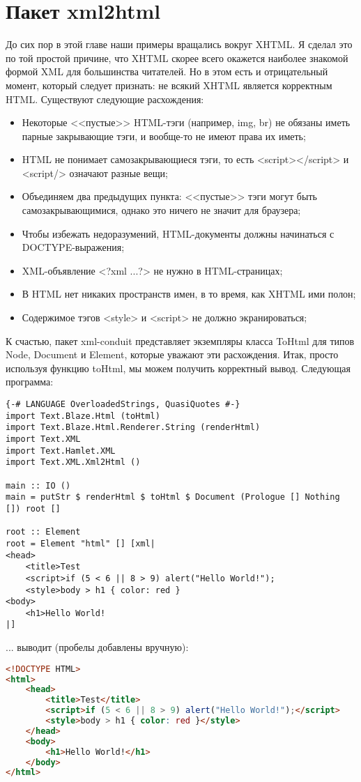 \section{Пакет xml2html}

До сих пор в этой главе наши примеры вращались вокруг XHTML. Я сделал это по той простой причине, что XHTML скорее всего окажется наиболее знакомой формой XML для большинства читателей. Но в этом есть и отрицательный момент, который следует признать: не всякий XHTML является корректным HTML. Существуют следующие расхождения:

\begin{itemize}
\item Некоторые <<пустые>> HTML-тэги (например, img, br) не обязаны иметь парные закрывающие тэги, и вообще-то не имеют права их иметь;
\item HTML не понимает самозакрывающиеся тэги, то есть <script></script> и <script/> означают разные вещи;
\item Объединяем два предыдущих пункта: <<пустые>> тэги могут быть самозакрывающимися, однако это ничего не значит для браузера;
\item Чтобы избежать недоразумений, HTML-документы должны начинаться с DOCTYPE-выражения;
\item XML-объявление <?xml ...?> не нужно в HTML-страницах;
\item В HTML нет никаких пространств имен, в то время, как XHTML ими полон;
\item Содержимое тэгов <style> и <script> не должно экранироваться; %
\end{itemize}
  
К счастью, пакет xml-conduit представляет экземпляры класса ToHtml для типов Node, Document и Element, которые уважают эти расхождения. Итак, просто используя функцию toHtml, мы можем получить корректный вывод. Следующая программа:

\begin{lstlisting}
{-# LANGUAGE OverloadedStrings, QuasiQuotes #-}
import Text.Blaze.Html (toHtml)
import Text.Blaze.Html.Renderer.String (renderHtml)
import Text.XML
import Text.Hamlet.XML
import Text.XML.Xml2Html ()

main :: IO ()
main = putStr $ renderHtml $ toHtml $ Document (Prologue [] Nothing []) root []

root :: Element
root = Element "html" [] [xml|
<head>
    <title>Test
    <script>if (5 < 6 || 8 > 9) alert("Hello World!");
    <style>body > h1 { color: red }
<body>
    <h1>Hello World!
|]
\end{lstlisting}%

... выводит (пробелы добавлены вручную):

\begin{lstlisting}[language=HTML]
<!DOCTYPE HTML>
<html>
    <head>
        <title>Test</title>
        <script>if (5 < 6 || 8 > 9) alert("Hello World!");</script>
        <style>body > h1 { color: red }</style>
    </head>
    <body>
        <h1>Hello World!</h1>
    </body>
</html>
\end{lstlisting}%
